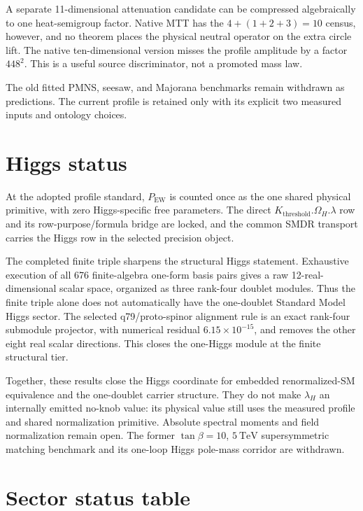 \documentclass[11pt]{article}
\begin{document}
A separate 11-dimensional attenuation candidate can be compressed
algebraically to one heat-semigroup factor. Native MTT has the
$4+(1+2+3)=10$ census, however, and no theorem places the physical neutral
operator on the extra circle lift. The native ten-dimensional version misses
the profile amplitude by a factor $448^2$. This is a useful source
discriminator, not a promoted mass law.

The old fitted PMNS, seesaw, and Majorana benchmarks remain withdrawn as
predictions. The current profile is retained only with its explicit two
measured inputs and ontology choices.

\section{Higgs status}

At the adopted profile standard, $P_{\mathrm{EW}}$ is counted once as the one
shared physical primitive, with zero Higgs-specific free parameters. The direct
$K_{\mathrm{threshold}}.\Omega_H.\lambda$ row and its row-purpose/formula bridge
are locked, and the common SMDR transport carries the Higgs row in the selected
precision object.

The completed finite triple sharpens the structural Higgs statement. Exhaustive
execution of all 676 finite-algebra one-form basis pairs gives a raw
12-real-dimensional scalar space, organized as three rank-four doublet
modules. Thus the finite triple alone does not automatically have the
one-doublet Standard Model Higgs sector. The selected q79/proto-spinor
alignment rule is an exact rank-four submodule projector, with numerical
residual $6.15\times10^{-15}$, and removes the other eight real scalar
directions. This closes the one-Higgs module at the finite structural tier.

Together, these results close the Higgs coordinate for embedded
renormalized-SM equivalence and the one-doublet carrier structure. They do not
make $\lambda_H$ an internally emitted no-knob value: its physical value still
uses the measured profile and shared normalization primitive. Absolute
spectral moments and field normalization remain open. The former
$\tan\beta=10$, $5~\mathrm{TeV}$ supersymmetric matching benchmark and its
one-loop Higgs pole-mass corridor are withdrawn.

\section{Sector status table}
\end{document}
